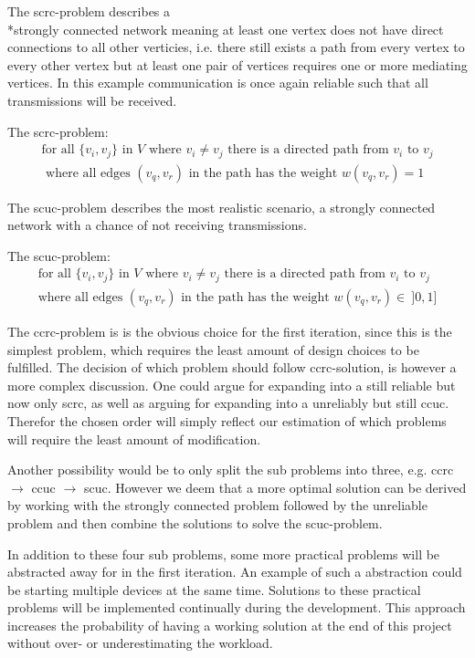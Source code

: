 \noindent The \gls{scrc}-problem describes a \\*strongly connected network meaning at least one vertex does not have direct connections to all other verticies, i.e. there still exists a path from every vertex to every other vertex but at least one pair of vertices requires one or more mediating vertices. 
In this example communication is once again reliable such that all transmissions will be received. 

\begin{definition}
	The \acrshort{scrc}-problem:
	\begin{align*}
		\text{for all } \{v_i, v_j\} \text{ in } V \text{ where } v_i \neq v_j \text{ there is a directed path from } v_i \text{ to } v_j\\
		\text{ where all edges } (v_q, v_r) \text{ in the path has the weight } w(v_q, v_r) = 1
	\end{align*}
\end{definition}

\noindent The \gls{scuc}-problem describes the most realistic scenario, a strongly connected network with a chance of not receiving transmissions. 

\begin{definition}
	The \acrshort{scuc}-problem:
	\begin{align*}
		\text{for all } \{v_i, v_j\} \text{ in } V \text{ where } v_i \neq v_j \text{ there is a directed path from } v_i \text{ to } v_j\\
		\text{where all edges } (v_q, v_r) \text{ in the path has the weight } w(v_q, v_r) \in\ ]0,1]
	\end{align*}
\end{definition}

\bigskip 
\noindent
The \gls{ccrc}-problem is is the obvious choice for the first iteration, since this is the simplest problem, which requires the least amount of design choices to be fulfilled.
The decision of which problem should follow \gls{ccrc}-solution, is however a more complex discussion.
One could argue for expanding into a still reliable but now only \acrlong{scrc}, as well as arguing for expanding into a unreliably but still \acrlong{ccuc}.
Therefor the chosen order will simply reflect our estimation of which problems will require the least amount of modification.

Another possibility would be to only split the sub problems into three, e.g. \gls{ccrc} $\rightarrow$ \gls{ccuc} $\rightarrow$ \gls{scuc}.
However we deem that a more optimal solution can be derived by working with the strongly connected problem followed by the unreliable problem and then combine the solutions to solve the \gls{scuc}-problem.

In addition to these four sub problems, some more practical problems will be abstracted away for in the first iteration.
An example of such a abstraction could be starting multiple devices at the same time.
Solutions to these practical problems will be implemented continually during the development. 
This approach increases the probability of having a working solution at the end of this project without over- or underestimating the workload. 
